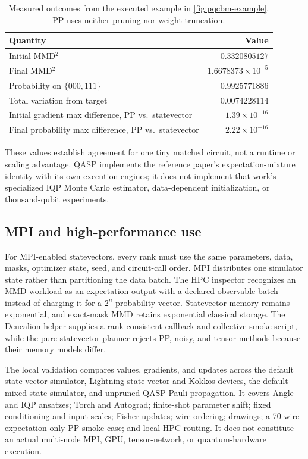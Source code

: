 \documentclass[10pt]{article}
\begin{document}
\begin{table}[H]
\centering
\caption{Measured outcomes from the executed example in
\cref{fig:pqcbm-example}.  PP uses neither pruning nor weight truncation.}
\label{tab:pqcbm-example}
\small
\begin{tabularx}{0.82\textwidth}{@{}Xr@{}}
\toprule
Quantity & Value \\
\midrule
Initial MMD$^2$ & $0.3320805127$ \\
Final MMD$^2$ & $1.6678373\times10^{-5}$ \\
Probability on $\{000,111\}$ & $0.9925771886$ \\
Total variation from target & $0.0074228114$ \\
Initial gradient max difference, PP vs.\ statevector & $1.39\times10^{-16}$ \\
Final probability max difference, PP vs.\ statevector & $2.22\times10^{-16}$ \\
\bottomrule
\end{tabularx}
\end{table}

These values establish agreement for one tiny matched circuit, not a runtime or
scaling advantage.  QASP implements the reference paper's
expectation-mixture identity with its own execution engines; it does not
implement that work's specialized IQP Monte Carlo estimator, data-dependent
initialization, or thousand-qubit experiments.

\subsection{MPI and high-performance use}

For MPI-enabled statevectors, every rank must use the same parameters, data,
masks, optimizer state, seed, and circuit-call order.  MPI distributes one
simulator state rather than partitioning the data batch.  The HPC inspector
recognizes an MMD workload as an expectation output with a declared observable
batch instead of charging it for a $2^n$ probability vector.  Statevector
memory remains exponential, and exact-mask MMD retains exponential classical
storage.  The Deucalion helper supplies a rank-consistent callback and
collective smoke script, while the pure-statevector planner rejects PP,
noisy, and tensor methods because their memory models differ.

The local validation compares values, gradients, and updates across the
default state-vector simulator, Lightning state-vector and Kokkos devices, the
default mixed-state simulator, and unpruned QASP Pauli propagation.  It covers
Angle and IQP ansatzes; Torch and Autograd; finite-shot parameter shift; fixed
conditioning and input scales; Fisher updates; wire ordering; drawings; a
70-wire expectation-only PP smoke case; and local HPC routing.  It does not
constitute an actual multi-node MPI, GPU, tensor-network, or quantum-hardware
execution.
\end{document}
